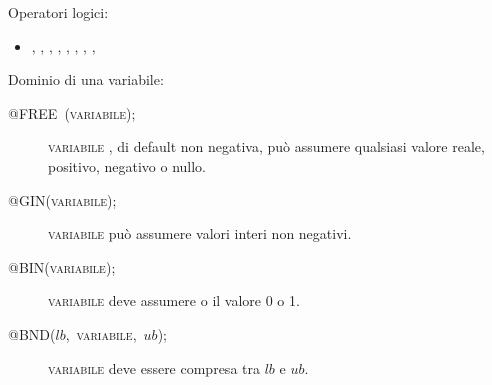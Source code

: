 \documentclass{beamer}
\newcommand{\noun}[1]{\textsc{#1}}
\def\lyxframeend{} %
\begin{document}
\begin{block}{Operatori logici:}
\begin{itemize}
\item {}, , , ,
, , , ,
\end{itemize}
\end{block}

\framebreak

\begin{block}{Dominio di una variabile:}
\begin{description}
\item [{@FREE~(\noun{variabile});}] \noun{variabile} , di default non
negativa, pu\`o assumere qualsiasi valore reale, positivo, negativo
o nullo.
\item [{@GIN(\noun{variabile});}] \noun{variabile} pu\`o assumere valori
interi non negativi. 
\item [{@BIN(\noun{variabile});}] \noun{variabile} deve assumere o il valore
0 o 1. 
\item [{@BND($lb$,~\noun{variabile},~$ub$);}] \noun{variabile} deve
essere compresa tra $lb$ e $ub$. 
\end{description}
\end{block}

\lyxframeend{}
\end{document}

